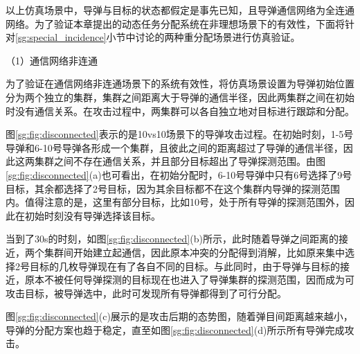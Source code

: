 以上仿真场景中，导弹与目标的状态都假定是事先已知，且导弹通信网络为全连通网络。为了验证本章提出的动态任务分配系统在非理想场景下的有效性，下面将针对\ref{sg:special_incidence}小节中讨论的两种重分配场景进行仿真验证。

（1）通信网络非连通

为了验证在通信网络非连通场景下的系统有效性，将仿真场景设置为导弹初始位置分为两个独立的集群，集群之间距离大于导弹的通信半径，因此两集群之间在初始时没有通信关系。在攻击过程中，两集群可以各自独立地对目标进行跟踪和分配。


图\ref{sg:fig:disconnected}表示的是10vs10场景下的导弹攻击过程。在初始时刻，1-5号导弹和6-10号导弹各形成一个集群，且彼此之间的距离超过了导弹的通信半径，因此这两集群之间不存在通信关系，并且部分目标超出了导弹探测范围。由图\ref{sg:fig:disconnected}(a)也可看出，在初始分配时，6-10号导弹中只有6号选择了9号目标，其余都选择了2号目标，因为其余目标都不在这个集群内导弹的探测范围内。值得注意的是，这里有部分目标，比如10号，处于所有导弹的探测范围外，因此在初始时刻没有导弹选择该目标。

当到了30s的时刻，如图\ref{sg:fig:disconnected}(b)所示，此时随着导弹之间距离的接近，两个集群间开始建立起通信，因此原本冲突的分配得到消解，比如原来集中选择2号目标的几枚导弹现在有了各自不同的目标。与此同时，由于导弹与目标的接近，原本不被任何导弹探测的目标现在也进入了导弹集群的探测范围，因而成为可攻击目标，被导弹选中，此时可发现所有导弹都得到了可行分配。

图\ref{sg:fig:disconnected}(c)展示的是攻击后期的态势图，随着弹目间距离越来越小，导弹的分配方案也趋于稳定，直至如图\ref{sg:fig:disconnected}(d)所示所有导弹完成攻击。

